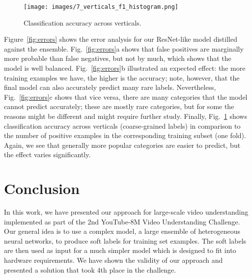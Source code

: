 \documentclass[runningheads]{llncs}
\begin{document}
\begin{figure}[t]\centering
\texttt{[image: images/7\_verticals\_f1\_histogram.png]}

\caption{Classification accuracy across verticals.}\label{fig:acc}
\end{figure}

Figure~\ref{fig:errors} shows the error analysis for our ResNet-like model distilled against the ensemble. Fig.~\ref{fig:errors}a shows that false positives are marginally more probable than false negatives, but not by much, which shows that the model is well balanced. Fig.~\ref{fig:errors}b illustrated an expected effect: the more training examples we have, the higher is the accuracy; note, however, that the final model can also accurately predict many rare labels. Nevertheless, Fig.~\ref{fig:errors}c shows that vice versa, there are many categories that the model cannot predict accurately; these are mostly rare categories, but for some the reasons might be different and might require further study. Finally, Fig.~\ref{fig:acc} shows classification accuracy across verticals (coarse-grained labels) in comparison to the number of positive examples in the corresponding training subset (one fold). Again, we see that generally more popular categories are easier to predict, but the effect varies significantly.


\section{Conclusion}\label{sec:concl}

In this work, we have presented our approach for large-scale video understanding implemented as part of the 2nd YouTube-8M Video Understanding Challenge. Our general idea is to use a complex model, a large ensemble of heterogeneous neural networks, to produce soft labels for training set examples. The soft labels are then used as input for a much simpler model which is designed to fit into hardware requirements. We have shown the validity of our approach and presented a solution that took 4th place in the challenge.
\end{document}
